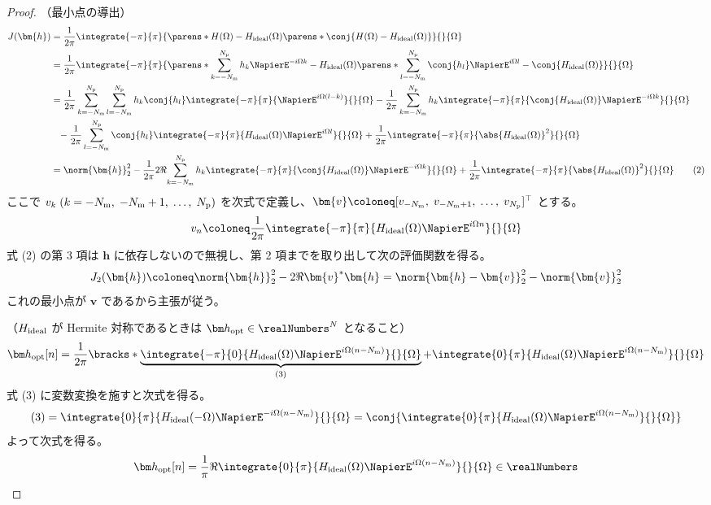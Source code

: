             \begin{proof}
                \quad\par\noindent
                （最小点の導出）
                \begin{align*}
                    J(\bm{h}) &= \frac{1}{2\pi}\integrate{-\pi}{\pi}{\parens*{H(\Omega)-\Hideal(\Omega)}\parens*{\conj{H(\Omega)-\Hideal(\Omega)}}}{}{\Omega} \\
                    &= \frac{1}{2\pi}\integrate{-\pi}{\pi}{\parens*{\sum_{k=-\Nm}^\Np h_k\NapierE^{-i\Omega k} -\Hideal(\Omega)}\parens*{\sum_{l=-\Nm}^\Np \conj{h_l}\NapierE^{i\Omega l} -\conj{\Hideal(\Omega)}}}{}{\Omega} \\
                    &= \frac{1}{2\pi}\sum_{k=-\Nm}^\Np\sum_{l=-\Nm}^\Np h_k\conj{h_l}\integrate{-\pi}{\pi}{\NapierE^{i\Omega(l-k)}}{}{\Omega} - \frac{1}{2\pi}\sum_{k=-\Nm}^\Np h_k\integrate{-\pi}{\pi}{\conj{\Hideal(\Omega)}\NapierE^{-i\Omega k}}{}{\Omega} \\
                    &\phantom{=}- \frac{1}{2\pi}\sum_{l=-\Nm}^\Np \conj{h_l}\integrate{-\pi}{\pi}{\Hideal(\Omega)\NapierE^{i\Omega l}}{}{\Omega} + \frac{1}{2\pi}\integrate{-\pi}{\pi}{\abs{\Hideal(\Omega)}^2}{}{\Omega} \\
                    &= \norm{\bm{h}}_2^2 - \frac{1}{2\pi}2\Re{\sum_{k=-\Nm}^\Np h_k\integrate{-\pi}{\pi}{\conj{\Hideal(\Omega)}\NapierE^{-i\Omega k}}{}{\Omega}} + \frac{1}{2\pi}\integrate{-\pi}{\pi}{\abs{\Hideal(\Omega)}^2}{}{\Omega} \tag{2}
                \end{align*}
                ここで $v_k\;(k=-{N_\text{m}},\;-{N_\text{m}}+1,\;\dots,\;{N_\text{p}})$ を次式で定義し、$\bm{v}\coloneq[v_{-\Nm},\;v_{-\Nm+1},\;\dots,\;v_\Np]^\top$ とする。
                \[ v_n \coloneq \frac{1}{2\pi}\integrate{-\pi}{\pi}{\Hideal(\Omega)\NapierE^{i\Omega n}}{}{\Omega} \]
                式 (2) の第 3 項は $\bm{h}$ に依存しないので無視し、第 2 項までを取り出して次の評価関数を得る。
                \[ J_2(\bm{h}) \coloneq \norm{\bm{h}}_2^2 - 2\Re{\bm{v}^*\bm{h}} = \norm{\bm{h} - \bm{v}}_2^2 - \norm{\bm{v}}_2^2 \]
                これの最小点が $\bm{v}$ であるから主張が従う。
                \newline
                \par\noindent
                （$H_\text{ideal}$ が Hermite 対称であるときは $\vhOpt\in\realNumbers^N$ となること）
                \[ \vhOpt[n] = \frac{1}{2\pi}\bracks*{\underbrace{\integrate{-\pi}{0}{\Hideal(\Omega)\NapierE^{i\Omega (n-\Nm)}}{}{\Omega}}_{(3)} + \integrate{0}{\pi}{\Hideal(\Omega)\NapierE^{i\Omega (n-\Nm)}}{}{\Omega}} \]
                式 (3) に変数変換を施すと次式を得る。
                \[ (3) = \integrate{0}{\pi}{\Hideal(-\Omega)\NapierE^{-i\Omega (n-\Nm)}}{}{\Omega} = \conj{\integrate{0}{\pi}{\Hideal(\Omega)\NapierE^{i\Omega (n-\Nm)}}{}{\Omega}} \]
                よって次式を得る。
                \[ \vhOpt[n] = \frac{1}{\pi}\Re{\integrate{0}{\pi}{\Hideal(\Omega)\NapierE^{i\Omega (n-\Nm)}}{}{\Omega}}\in\realNumbers \]
            \end{proof}
